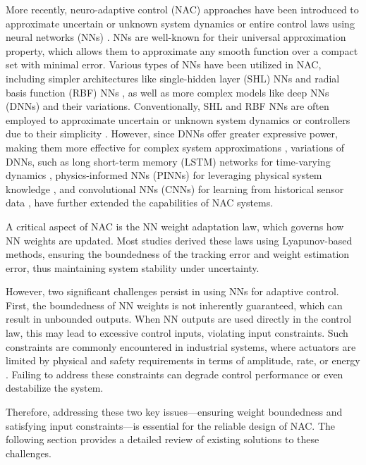 \documentclass[letterpaper, journal]{IEEEtran}
\begin{document}
More recently, neuro-adaptive control (NAC) approaches have been introduced to approximate uncertain or unknown system dynamics or entire control laws using neural networks (NNs) \cite{Lewis:1998aa,Farrell:2006aa}. 
NNs are well-known for their universal approximation property, which allows them to approximate any smooth function over a compact set with minimal error. 
Various types of NNs have been utilized in NAC, including simpler architectures like single-hidden layer (SHL) NNs \cite{Lewis:1996aa,Ge:2010aa, Yesildirek:1995aa,Ryu:2024aa,Ryu:2025aa} and radial basis function (RBF) NNs \cite{Liu:2013ab,Ge:2002aa}, as well as more complex models like deep NNs (DNNs) \cite{Patil:2022aa} and their variations. 
Conventionally, SHL and RBF NNs are often employed to approximate uncertain or unknown system dynamics or controllers due to their simplicity \cite{Esfandiari:2014aa,Esfandiari:2015aa,Yesildirek:1995aa,Gao:2006aa}.
However, since DNNs offer greater expressive power, making them more effective for complex system approximations \cite{Rolnick:2018aa}, variations of DNNs, such as long short-term memory (LSTM) networks for time-varying dynamics \cite{Griffis:2023aa}, physics-informed NNs (PINNs) for leveraging physical system knowledge \cite{Hart:2024aa}, and convolutional NNs (CNNs) for learning from historical sensor data \cite{Ryu:2024ac}, have further extended the capabilities of NAC systems.

A critical aspect of NAC is the NN weight adaptation law, which governs how NN weights are updated. 
Most studies derived these laws using Lyapunov-based methods, ensuring the boundedness of the tracking error and weight estimation error, thus maintaining system stability under uncertainty.

However, two significant challenges persist in using NNs for adaptive control. 
First, the boundedness of NN weights is not inherently guaranteed, which can result in unbounded outputs. 
When NN outputs are used directly in the control law, this may lead to excessive control inputs, violating input constraints. 
Such constraints are commonly encountered in industrial systems, where actuators are limited by physical and safety requirements in terms of amplitude, rate, or energy \cite{Esfandiari:2021aa}. 
Failing to address these constraints can degrade control performance or even destabilize the system.

Therefore, addressing these two key issues—ensuring weight boundedness and satisfying input constraints—is essential for the reliable design of NAC. 
The following section provides a detailed review of existing solutions to these challenges.
\end{document}

